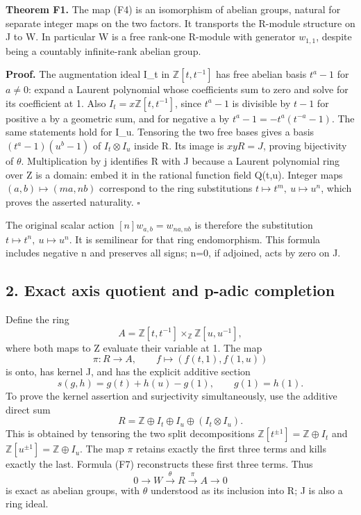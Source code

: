 \documentclass[
]{article}
\begin{document}
\textbf{Theorem F1.} The map (F4) is an isomorphism of abelian groups,
natural for separate integer maps on the two factors. It transports the
R-module structure on J to W. In particular W is a free rank-one
R-module with generator \(w_{1,1}\), despite being a countably
infinite-rank abelian group.

\textbf{Proof.} The augmentation ideal I\_t in \(\mathbb Z[t,t^{-1}]\)
has free abelian basis \(t^a-1\) for \(a\ne0\): expand a Laurent
polynomial whose coefficients sum to zero and solve for its coefficient
at 1. Also \(I_t=x\mathbb Z[t,t^{-1}]\), since \(t^a-1\) is divisible by
\(t-1\) for positive a by a geometric sum, and for negative a by
\(t^a-1=-t^a(t^{-a}-1)\). The same statements hold for I\_u. Tensoring
the two free bases gives a basis \((t^a-1)(u^b-1)\) of
\(I_t\otimes I_u\) inside R. Its image is \(xyR=J\), proving bijectivity
of \(\theta\). Multiplication by j identifies R with J because a Laurent
polynomial ring over Z is a domain: embed it in the rational function
field Q(t,u). Integer maps \((a,b)\mapsto(ma,nb)\) correspond to the
ring substitutions \(t\mapsto t^m,\ u\mapsto u^n\), which proves the
asserted naturality. \(\square\)

The original scalar action \([n]w_{a,b}=w_{na,nb}\) is therefore the
substitution \(t\mapsto t^n,\ u\mapsto u^n\). It is semilinear for that
ring endomorphism. This formula includes negative n and preserves all
signs; n=0, if adjoined, acts by zero on J.

\subsection{2. Exact axis quotient and p-adic
completion}\label{exact-axis-quotient-and-p-adic-completion}

Define the ring \[
A=\mathbb Z[t,t^{-1}]\times_{\mathbb Z}\mathbb Z[u,u^{-1}],
\tag{F5}
\] where both maps to Z evaluate their variable at 1. The map \[
\pi:R\longrightarrow A,\qquad f\longmapsto(f(t,1),f(1,u))
\tag{F6}
\] is onto, has kernel J, and has the explicit additive section \[
s(g,h)=g(t)+h(u)-g(1),\qquad g(1)=h(1).
\tag{F7}
\] To prove the kernel assertion and surjectivity simultaneously, use
the additive direct sum \[
R=\mathbb Z\oplus I_t\oplus I_u\oplus(I_t\otimes I_u).
\tag{F8}
\] This is obtained by tensoring the two split decompositions
\(\mathbb Z[t^{\pm1}]=\mathbb Z\oplus I_t\) and
\(\mathbb Z[u^{\pm1}]=\mathbb Z\oplus I_u\). The map \(\pi\) retains
exactly the first three terms and kills exactly the last. Formula (F7)
reconstructs these first three terms. Thus \[
0\longrightarrow W\xrightarrow{\theta}R\xrightarrow{\pi}A\longrightarrow0
\tag{F9}
\] is exact as abelian groups, with \(\theta\) understood as its
inclusion into R; J is also a ring ideal.
\end{document}
